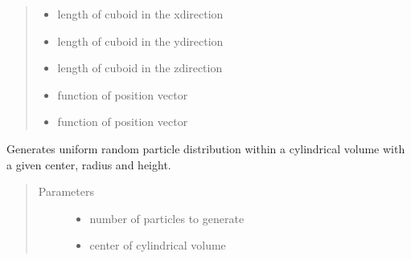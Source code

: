 \documentclass[letterpaper,10pt,english]{sphinxmanual}
\begin{document}
\begin{itemize}
\begin{fulllineitems}
\begin{fulllineitems}
\begin{quote}
\begin{description}
\begin{itemize}
\item {} 
\sphinxAtStartPar
{} \textendash{} length of cuboid in the x\sphinxhyphen{}direction

\item {} 
\sphinxAtStartPar
{} \textendash{} length of cuboid in the y\sphinxhyphen{}direction

\item {} 
\sphinxAtStartPar
{} \textendash{} length of cuboid in the z\sphinxhyphen{}direction

\item {} 
\sphinxAtStartPar
{} \textendash{} function of position vector

\item {} 
\sphinxAtStartPar
{} \textendash{} function of position vector

\end{itemize}

\end{description}\end{quote}

\end{fulllineitems}


\begin{fulllineitems}
\label{\detokenize{space:nbody.simulator.space.Space.add_cylinder}}
\sphinxAtStartPar
Generates uniform random particle distribution within a cylindrical
volume with a given center, radius and height.
\begin{quote}\begin{description}
\item[{Parameters}] \leavevmode\begin{itemize}
\item {} 
\sphinxAtStartPar
{} \textendash{} number of particles to generate

\item {} 
\sphinxAtStartPar
{} \textendash{} center of cylindrical volume


\end{itemize}
\end{description}
\end{quote}
\end{fulllineitems}
\end{fulllineitems}
\end{itemize}
\end{document}
